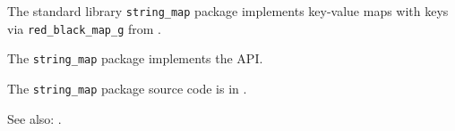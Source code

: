 
The standard library {\tt string\_map} package implements key-value maps with  
keys via {\tt red\_black\_map\_g} from  
.

The {\tt string\_map} package implements the  API.

The {\tt string\_map} package source code is in .

See also:  .



